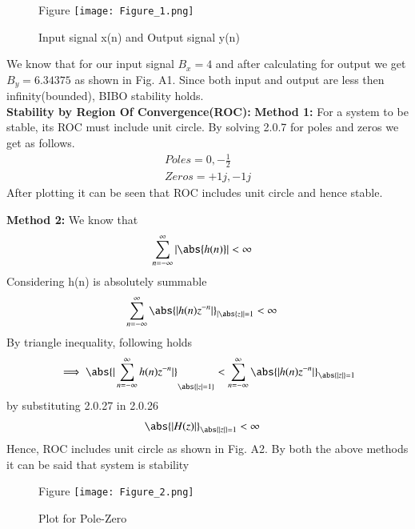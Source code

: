 \documentclass[journal,12pt,twocolumn]{IEEEtran}
\begin{document}
\renewcommand{\thefigure}{A\arabic{figure}}

\setcounter{figure}{0}
\begin{figure}[htp]
   \centering Figure
    \texttt{[image: Figure\_1.png]}
    \caption{Input signal x(n) and Output signal y(n)}
\end{figure}

We know that for our input signal $B_x=4$ and after calculating for output we get $B_y=6.34375$ as shown in Fig. A1. Since both input and output are less then infinity(bounded), BIBO stability holds.\\

\textbf{Stability by Region Of Convergence(ROC):}
\textbf{Method 1:}
For a system to be stable, its ROC must include unit circle. By solving 2.0.7 for poles and zeros we get as follows.
\begin{align}
    Poles = 0 , -\frac{1}{2} \\
    Zeros = +1j, -1j
\end{align}
After plotting it can be seen that ROC includes unit circle and hence stable.

\textbf{Method 2:}
We know that
\begin{align}
    \sum_{n=-\infty}^{\infty} |\abs{h(n)}|  &< \infty 
\end{align}
Considering h(n) is absolutely summable
\begin{align}
    \sum_{n=-\infty}^{\infty}\abs{|h(n)z^{-n}|}_{|\abs{z}|=1}&<\infty 
\end{align}
By triangle inequality, following holds
\begin{align}
   \implies \abs{|\sum_{n=-\infty}^{\infty}h(n)z^{-n}|}_\abs{|z|=1}<\sum_{n=-\infty}^{\infty}\abs{|h(n)z^{-n}|}_{\abs{|z|}=1}
\end{align}
by substituting 2.0.27 in 2.0.26
\begin{align}
   \abs{|H(z)|}_{\abs{|z|}=1}&<\infty 
\end{align}
Hence, ROC includes unit circle as shown in Fig. A2. By both the above methods it can be said that system is stability 
\begin{figure}[htp]
    \centering Figure
    \texttt{[image: Figure\_2.png]}
    \caption{Plot for Pole-Zero}
\end{figure}\\
\end{document}
